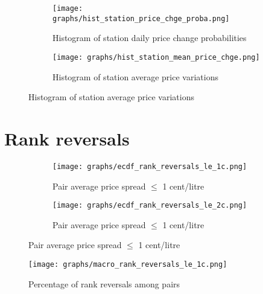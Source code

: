 \documentclass[english]{article}
\begin{document}
{{\begin{figure}[H]
\centering
\caption{Price changes by station)}
\begin{subfigure}{.4\linewidth}
\centering
\texttt{[image: graphs/hist\_station\_price\_chge\_proba.png]}
\caption[short]{Histogram of station daily price change probabilities}
\label{fig:hist_station_price_chge_proba}
\end{subfigure}
\begin{subfigure}{.4\linewidth}
\centering
\texttt{[image: graphs/hist\_station\_mean\_price\_chge.png]}
\caption[short]{Histogram of station average price variations}
\label{fig:hist_station_mean_price_chge}
\end{subfigure}
\end{figure}

\newpage

\section{Rank reversals}

\begin{figure}[H]
\centering
\caption{Empirical distribution functions of rank reversals (raw prices)}
\begin{subfigure}{.4\linewidth}
\centering
\texttt{[image: graphs/ecdf\_rank\_reversals\_le\_1c.png]}
\caption[short]{Pair average price spread $\le$ 1 cent/litre}
\end{subfigure}
\begin{subfigure}{.4\linewidth}
\centering
\texttt{[image: graphs/ecdf\_rank\_reversals\_le\_2c.png]}
\caption[short]{Pair average price spread $\le$ 1 cent/litre}
\end{subfigure}
\end{figure}

\begin{figure}[!h]
    \caption{Percentage of rank reversals among pairs}
	\centering
		\texttt{[image: graphs/macro\_rank\_reversals\_le\_1c.png]}
\end{figure}

}}
\end{document}
